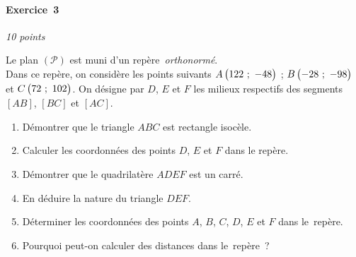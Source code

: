 \vspace*{1em}

\begin{minipage}{0.45\textwidth}
\thispagestyle{sujet2}

\vspace*{1em}

%


\paragraph{Exercice~3} \hfill \emph{10 points}

Le plan $\left(\mathscr{P}\right)$ est muni d'un repère~\emph{orthonormé}.\\ Dans ce repère, on considère les points suivants $A\begin{pmatrix}122~;~-48\end{pmatrix}$ ; $B\begin{pmatrix}-28~;~-98\end{pmatrix}$ et $C\begin{pmatrix}72~;~102\end{pmatrix}$.
On désigne par $D$, $E$ et $F$ les milieux respectifs des segments $\left[AB\right]$,  $\left[BC\right]$ et $\left[AC\right]$.

\begin{enumerate}
	\item Démontrer que le triangle $ABC$ est rectangle isocèle.
	\item Calculer les coordonnées des points $D$, $E$ et $F$ dans le repère.
	\item Démontrer que le quadrilatère $ADEF$ est un carré.
	\item En déduire la nature du triangle $DEF$.
	\item Déterminer les coordonnées des points $A$, $B$, $C$, $D$, $E$ et $F$ dans le~repère.
	\item Pourquoi peut-on calculer des distances dans le~repère~?
\end{enumerate}

\vspace*{2em}

\centering
{}


\end{minipage}